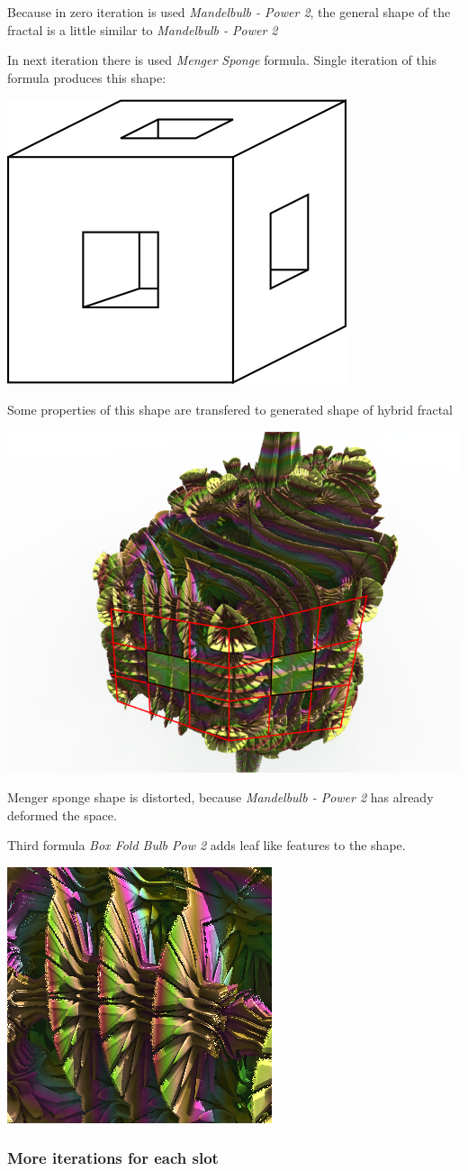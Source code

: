 Because in zero iteration is used \emph{Mandelbulb - Power 2}, the general shape of the fractal is a little similar to \emph{Mandelbulb - Power 2}

In next iteration there is used \emph{Menger Sponge} formula. Single iteration of this formula produces this shape:

\includegraphics[width=0.2\linewidth]{img/manual/media/single_iteration_of_menger_sponge.png}

Some properties of this shape are transfered to generated shape of hybrid fractal

\includegraphics[width=0.5\linewidth]{img/manual/media/single_iteration_of_menger_sponge_hybrid.png}

Menger sponge shape is distorted, because \emph{Mandelbulb - Power 2} has already deformed the space.

Third formula \emph{Box Fold Bulb Pow 2} adds leaf like features to the shape.

\includegraphics[width=0.4\linewidth]{img/manual/media/hybrid_sequence_example_1_leaf_shapes.png}

\subsubsection{More iterations for each slot}

